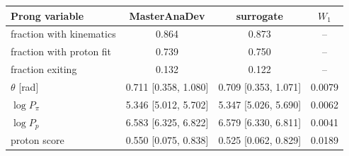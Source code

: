 \begin{tabular}{lccc}
\toprule
Prong variable & MasterAnaDev & surrogate & $W_1$ \\
\midrule
fraction with kinematics & 0.864 & 0.873 & -- \\
fraction with proton fit & 0.739 & 0.750 & -- \\
fraction exiting & 0.132 & 0.122 & -- \\
$\theta$ [rad] & 0.711 [0.358, 1.080] & 0.709 [0.353, 1.071] & 0.0079 \\
$\log P_\pi$ & 5.346 [5.012, 5.702] & 5.347 [5.026, 5.690] & 0.0062 \\
$\log P_p$ & 6.583 [6.325, 6.822] & 6.579 [6.330, 6.811] & 0.0041 \\
proton score & 0.550 [0.075, 0.838] & 0.525 [0.062, 0.829] & 0.0189 \\
\bottomrule
\end{tabular}
